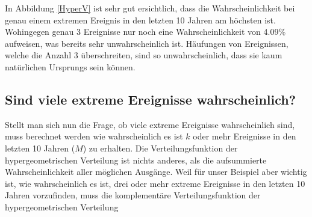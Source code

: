 \begin{refsection}
In Abbildung \ref{HyperV} ist sehr gut ersichtlich, dass die Wahrscheinlichkeit bei genau einem extremen Ereignis in den letzten 10 Jahren am höchsten ist. Wohingegen genau 3 Ereignisse nur noch eine Wahrscheinlichkeit von 4.09\% aufweisen, was bereits sehr unwahrscheinlich ist. Häufungen von Ereignissen, welche die Anzahl 3 überschreiten, sind so unwahrscheinlich, dass sie kaum natürlichen Ursprungs sein können.

\subsection{Sind viele extreme Ereignisse wahrscheinlich?}
Stellt man sich nun die Frage, ob viele extreme Ereignisse wahrscheinlich sind, muss berechnet werden wie wahrscheinlich es ist $k$ oder mehr Ereignisse in den letzten 10 Jahren ($M$) zu erhalten. 
Die Verteilungsfunktion der hypergeometrischen Verteilung ist nichts anderes, als die aufsummierte Wahrscheinlichkeit aller möglichen Ausgänge. Weil für unser Beispiel aber wichtig ist, wie wahrscheinlich es ist, drei oder mehr extreme Ereignisse in den letzten 10 Jahren vorzufinden, muss die komplementäre Verteilungsfunktion der hypergeometrischen Verteilung


\end{refsection}
